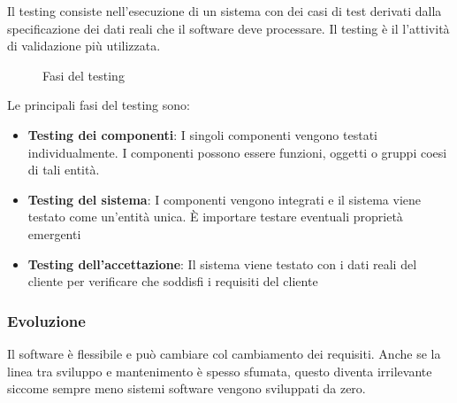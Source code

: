 \documentclass[a4paper]{article}
\begin{document}
Il testing consiste nell'esecuzione di un sistema con dei casi di test derivati dalla
specificazione dei dati reali che il software deve processare. Il testing è il l'attività
di validazione più utilizzata.
\begin{figure}[H]
  \centering
  \caption{Fasi del testing}
\end{figure}

\noindent
Le principali fasi del testing sono:
\begin{itemize}
  \item \textbf{Testing dei componenti}: I singoli componenti vengono testati
    individualmente. I componenti possono essere funzioni, oggetti o gruppi coesi di
    tali entità.

  \item \textbf{Testing del sistema}: I componenti vengono integrati e il sistema
    viene testato come un'entità unica. È importare testare eventuali proprietà emergenti

  \item \textbf{Testing dell'accettazione}: Il sistema viene testato con i dati reali
    del cliente per verificare che soddisfi i requisiti del cliente
\end{itemize}

\subsubsection{Evoluzione}
Il software è flessibile e può cambiare col cambiamento dei requisiti. Anche se la linea
tra sviluppo e mantenimento è spesso sfumata, questo diventa irrilevante siccome sempre
meno sistemi software vengono sviluppati da zero.
\end{document}
